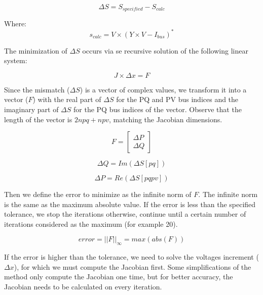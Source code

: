 \documentclass[nols,a4paper,twoside,notoc,fleqn]{tufte-book}
\begin{document}
\begin{equation}
\Delta S = S_{specified} - S_{calc} 
\end{equation}

Where:
\begin{equation}
s_{calc} = V \times (Y \times V - I_{bus})^*
\label{eq:nr_Scalc}
\end{equation}

The minimization of $\Delta S$ occurs via se recursive solution of the following linear system:

\begin{equation}
J \times \Delta x = F
\end{equation}

Since the mismatch ($\Delta S$) is a vector of complex values, we transform it into a vector ($F$) with the real part of $\Delta S$ for the PQ and PV bus indices and the imaginary part of $\Delta S$ for the PQ bus indices of the vector. Observe that the length of the vector is $2npq+npv$, matching the Jacobian dimensions.



\begin{equation}
F =  \left[
\begin{array}{c}
\Delta P \\
\Delta Q  
\end{array}
\right]
\label{eq:nr_mismatch}
\end{equation}

\begin{equation}
\Delta Q = Im(\Delta S[pq]) 
\label{eq:nr_q_inc}
\end{equation}

\begin{equation}
\Delta P = Re(\Delta S[pqpv])
\label{eq:nr_p_inc}
\end{equation}

Then we define the error to minimize as the infinite norm of $F$. The infinite norm is the same as the maximum absolute value. If the error is less than the specified tolerance, we stop the iterations otherwise, continue until a certain number of iterations considered as the maximum (for example 20).

\begin{equation}
error = ||F||_{\infty} = max(abs(F))
\label{eq:nr_error}
\end{equation}

If the error is higher than the tolerance, we need to solve the voltages increment ($\Delta x$), for which we must compute the Jacobian first. Some simplifications of the method only compute the Jacobian one time, but for better accuracy, the Jacobian needs to be calculated on every iteration.
\end{document}
